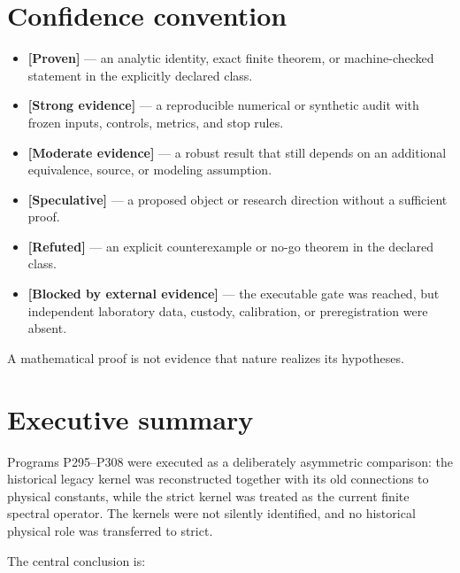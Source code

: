 \documentclass[11pt,a4paper,openany]{report}
\newcommand{\statusProven}{\textcolor{fingreen}{[Proven]}}
\newcommand{\statusStrong}{\textcolor{finblue}{[Strong evidence]}}
\newcommand{\statusModerate}{\textcolor{finviolet}{[Moderate evidence]}}
\newcommand{\statusSpeculative}{\textcolor{finorange}{[Speculative]}}
\newcommand{\statusRefuted}{\textcolor{finred}{[Refuted]}}
\begin{document}
\tableofcontents
\clearpage
{}

\chapter*{Confidence convention}

\begin{itemize}
\item 
\textbf{\statusProven{}} --- an analytic identity, exact finite theorem, or machine-checked statement in the explicitly declared class.

\item 
\textbf{\statusStrong{}} --- a reproducible numerical or synthetic audit with frozen inputs, controls, metrics, and stop rules.

\item 
\textbf{\statusModerate{}} --- a robust result that still depends on an additional equivalence, source, or modeling assumption.

\item 
\textbf{\statusSpeculative{}} --- a proposed object or research direction without a sufficient proof.

\item 
\textbf{\statusRefuted{}} --- an explicit counterexample or no-go theorem in the declared class.

\item 
\textbf{[Blocked by external evidence]} --- the executable gate was reached, but independent laboratory data, custody, calibration, or preregistration were absent.

\end{itemize}

A mathematical proof is not evidence that nature realizes its hypotheses.

\chapter{Executive summary}

Programs P295--P308 were executed as a deliberately asymmetric comparison: the historical legacy kernel was reconstructed together with its old connections to physical constants, while the strict kernel was treated as the current finite spectral operator. The kernels were not silently identified, and no historical physical role was transferred to strict.

The central conclusion is:
\end{document}
